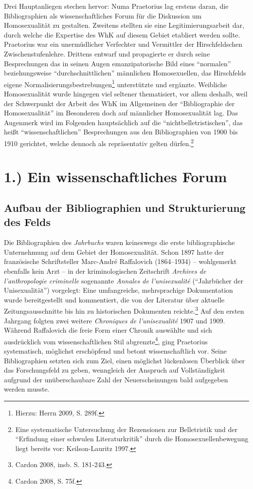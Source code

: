 \documentclass[a4paper,
fontsize=11pt,
oneside,
numbers=noperiodatend,
parskip=half-,
bibliography=totoc,
final
]{scrartcl}
\begin{document}
Drei Hauptanliegen stechen hervor: Numa Praetorius lag erstens daran,
die Bibliographien als wissenschaftliches Forum für die Diskussion um
Homosexualität zu gestalten. Zweitens stellten sie eine
Legitimierungsarbeit dar, durch welche die Expertise des WhK auf diesem
Gebiet etabliert werden sollte. Praetorius war ein unermüdlicher
Verfechter und Vermittler der Hirschfeldschen Zwischenstufenlehre.
Drittens entwarf und propagierte er durch seine Besprechungen das in
seinen Augen emanzipatorische Bild eines \enquote{normalen}
beziehungsweise \enquote{durchschnittlichen} männlichen Homosexuellen,
das Hirschfelds eigene Normalisierungsbestrebungen\footnote{Hierzu:
  Herrn 2009, S. 289f.} unterstützte und ergänzte. Weibliche
Homosexualität wurde hingegen viel seltener thematisiert, vor allem
deshalb, weil der Schwerpunkt der Arbeit des WhK im Allgemeinen der
\enquote{Bibliographie der Homosexualität} im Besonderen doch auf
männlicher Homosexualität lag. Das Augenmerk wird im Folgenden
hauptsächlich auf die \enquote{nichtbelletristischen}, das heißt
\enquote{wissenschaftlichen} Besprechungen aus den Bibliographien von
1900 bis 1910 gerichtet, welche dennoch als repräsentativ gelten
dürfen.\footnote{Eine systematische Untersuchung der Rezensionen zur
  Belletristik und der \enquote{Erfindung einer schwulen
  Literaturkritik} durch die Homosexuellenbewegung liegt bereits vor:
  Keilson-Lauritz 1997.}

\newpage

\section*{1.) Ein wissenschaftliches
Forum}\label{ein-wissenschaftliches-forum}

\subsection*{Aufbau der Bibliographien und Strukturierung des
Felds}\label{aufbau-der-bibliographien-und-strukturierung-des-felds}

Die Bibliographien des \emph{Jahrbuchs} waren keineswegs die erste
bibliographische Unternehmung auf dem Gebiet der Homosexualität. Schon
1897 hatte der französische Schriftsteller Marc-André Raffalovich
(1864--1934) -- wohlgemerkt ebenfalls kein Arzt -- in der
kriminologischen Zeitschrift \emph{Archives de l'anthropologie
criminelle} sogenannte \emph{Annales de l'unisexualité}
(\enquote{Jahrbücher der Unisexualität}) vorgelegt: Eine umfangreiche,
mehrsprachige Dokumentation wurde bereitgestellt und kommentiert, die
von der Literatur über aktuelle Zeitungsausschnitte bis hin zu
historischen Dokumenten reichte.\footnote{Cardon 2008, insb. S. 181-243.}
Auf den ersten Jahrgang folgten zwei weitere \emph{Chroniques de
l'unisex\-ualité} 1907 und 1909. Während Raffalovich die freie Form einer
Chronik auswählte und sich ausdrücklich vom wissenschaftlichen Stil
abgrenzte\footnote{Cardon 2008, S. 75f.}, ging Praetorius systematisch,
möglichst erschöpfend und betont wissenschaftlich vor. Seine
Bibliographien setzten sich zum Ziel, einen möglichst lückenlosen
Überblick über das Forschungsfeld zu geben, wenngleich der Anspruch auf
Vollständigkeit aufgrund der unüberschaubare Zahl der Neuerscheinungen
bald aufgegeben werden musste.
\end{document}
